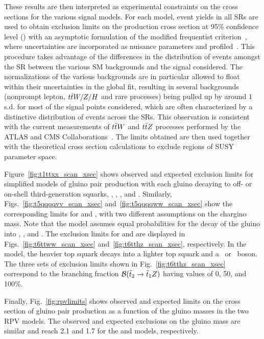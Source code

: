 These results are then interpreted as experimental constraints on the cross sections for
the various signal models. For each model,
event yields in all SRs are used to obtain exclusion limits
on the production cross section at 95\% confidence level (\CL) with
an asymptotic formulation of the modified frequentist \CLs
criterion~\cite{STAT:Junk1999kv,STAT:Read2002hq,STAT:ATLPHYSPUB2011011,STAT:Cowan2010js},
where uncertainties are incorporated as nuisance parameters and profiled~\cite{STAT:ATLPHYSPUB2011011}.
This procedure takes advantage of the differences in the distribution of events amongst the SR between the various SM backgrounds and the signal considered.
The normalizations of the various backgrounds are in particular allowed to float within their uncertainties in the global fit, resulting in several backgrounds (nonprompt lepton, $t\bar{t} W/Z/H$ and rare processes) being pulled up by around $1$ s.d. for most of the signal points considered, which are often characterized by a distinctive distribution of events across the SRs. 
This observation is consistent with the current measurements of $t\bar{t} W$ and $t\bar{t} Z$ processes performed by the ATLAS and CMS Collaborations~\cite{ATLAS:ttV,CMS:ttV}.
The limits obtained are then used together with the theoretical cross section
calculations to exclude regions of SUSY parameter space.


Figure~\ref{fig:t1ttxx_scan_xsec} shows observed and expected exclusion limits
for simplified models of gluino pair production with each gluino decaying
to off- or on-shell third-generation squarks,
\Totttt, \TfttbbWW, \Tftttt, and \Tfttcc.
Similarly, Figs.~\ref{fig:t5qqqqvv_scan_xsec} and~\ref{fig:t5qqqqww_scan_xsec} show the corresponding limits for \TfqqqqWZ and \TfqqqqWW, with
two different assumptions on the chargino mass.
Note that the \TfqqqqWZ model assumes equal probabilities for
the decay of the gluino into \chiplus, \chiminus, and \neutralinotwo.
The exclusion limits for \TsttWW and \TsttHZ are displayed in
Figs.~\ref{fig:t6ttww_scan_xsec} and~\ref{fig:t6tthz_scan_xsec},
respectively.
In the \TsttHZ model, the heavier top squark decays
into a lighter top squark and a \PZ\ or \PH\ boson. The three
sets of exclusion limits shown in Fig.~\ref{fig:t6tthz_scan_xsec}
correspond to the branching fraction $\mathcal{B}(\tilde{t}_2\to\tilde{t}_1Z)$ having values of
0, 50, and 100\%.

Finally, Fig.~\ref{fig:rpvlimits} shows observed and expected limits on
the cross section of gluino pair production as a function of the gluino masses in
the two RPV models.
The observed and expected exclusions on the gluino mass are similar and reach 2.1 and 1.7 \TeV for the \ToqqqqL and \Totbs models, respectively.

